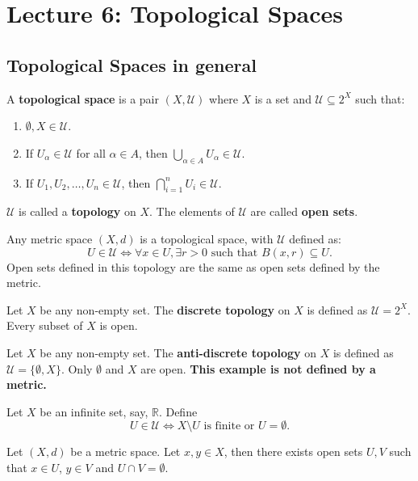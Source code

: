 \documentclass[main.tex]{subfiles}
\begin{document}
\pagestyle{plain}
\setcounter{chapter}{5}

\chapter{Lecture 6: Topological Spaces}
\label{chap:chapter6}

\section{Topological Spaces in general}

\begin{definition}
    A \textbf{topological space} is a pair $(X, \mathcal{U})$ where $X$ is a set and $\mathcal{U} \subseteq 2^X$ such that:
   \begin{enumerate}
        \item $\emptyset, X \in \mathcal{U}$. 
        \item If $U_{\alpha} \in \mathcal{U}$ for all $\alpha \in A$, then $\bigcup_{\alpha \in A} U_{\alpha} \in \mathcal{U}$.
        \item If $U_1, U_2, \ldots, U_n \in \mathcal{U}$, then $\bigcap_{i=1}^n U_i \in \mathcal{U}$.
   \end{enumerate} 
   \par $\mathcal{U}$ is called a \textbf{topology} on $X$. The elements of $\mathcal{U}$ are called \textbf{open sets}.
\end{definition}

\begin{example}
    Any metric space $(X, d)$ is a topological space, with $\mathcal{U}$ defined as: 
    \begin{equation}
        U\in \mathcal{U} \iff \forall x \in U, \exists r > 0 \text{ such that } B(x, r) \subseteq U.
    \end{equation}
    Open sets defined in this topology are the same as open sets defined by the metric. 
\end{example}
\begin{example}
    Let $X$ be any non-empty set. The \textbf{discrete topology} on $X$ is defined as $\mathcal{U} = 2^X$. Every subset of $X$ is open. 
\end{example}
\begin{example}\label{Not metric1}
    Let $X$ be any non-empty set. The \textbf{anti-discrete topology} on $X$ is defined as $\mathcal{U} = \{\emptyset, X\}$. Only $\emptyset$ and $X$ are open. \textbf{This example is not defined by a metric. }
\end{example}
\begin{example}
    \label{Not metric2}
    Let $X$ be an infinite set, say, $\mathbb{R}$. Define  
    \begin{equation}
        U \in \mathcal{U} \Longleftrightarrow X \setminus U \text{ is finite or } U = \emptyset. 
    \end{equation}
\end{example}
\begin{property}
    Let $(X, d)$ be a metric space. Let $x, y\in X$, then there exists open sets $U, V$ such that $x \in U$, $y \in V$ and $U \cap V = \emptyset$. 
\end{property}
\end{document}
